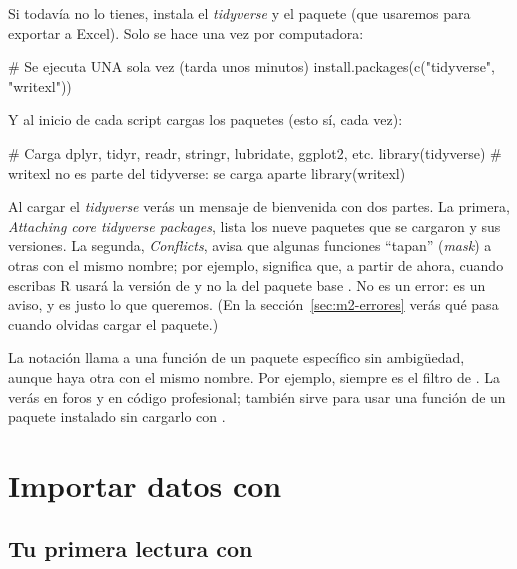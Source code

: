 Si todavía no lo tienes, instala el \emph{tidyverse} y el paquete
 (que usaremos para exportar a Excel). Solo se hace una vez
por computadora:

\begin{rnoejecutar}
# Se ejecuta UNA sola vez (tarda unos minutos)
install.packages(c("tidyverse", "writexl"))
\end{rnoejecutar}

Y al inicio de cada script cargas los paquetes (esto sí, cada vez):

\begin{rcode}
# Carga dplyr, tidyr, readr, stringr, lubridate, ggplot2, etc.
library(tidyverse)
# writexl no es parte del tidyverse: se carga aparte
library(writexl)
\end{rcode}

Al cargar el \emph{tidyverse} verás un mensaje de bienvenida con dos partes.
La primera, \emph{Attaching core tidyverse packages}, lista los nueve paquetes
que se cargaron y sus versiones. La segunda, \emph{Conflicts}, avisa que
algunas funciones ``tapan'' (\emph{mask}) a otras con el mismo nombre; por
ejemplo,  significa que, a
partir de ahora, cuando escribas  R usará la versión de
 y no la del paquete base . No es un error:
es un aviso, y es justo lo que queremos. (En la sección~\ref{sec:m2-errores}
verás qué pasa cuando olvidas cargar el paquete.)

\begin{consejo}
La notación  llama a una función de un paquete
específico sin ambigüedad, aunque haya otra con el mismo nombre. Por ejemplo,
 siempre es el filtro de . La verás
en foros y en código profesional; también sirve para usar una función de un
paquete instalado sin cargarlo con .
\end{consejo}

\section{Importar datos con \texorpdfstring{}{readr}}
\label{sec:m2-readr}

\subsection{Tu primera lectura con \texorpdfstring{}{read\_csv()}}

